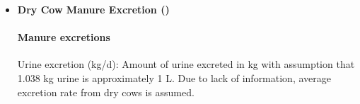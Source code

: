 \documentclass{article}
\begin{document}
\begin{refsection}
\begin{itemize}
Urine N excretion (kg/d)
        \vspace{0.5cm}
    
    \begin{center}
        \(
\text{urine}_{\text{nitrogen}} = \text{manure}_{\text{nitrogen}} - \text{fecal}_{\text{nitrogen}}
\)

    \end{center}
        \vspace{0.5cm} 
    
            {\raggedleft \textbf{[AN.EXC.16]}\par}
            \vspace{0.5cm}

Manure total ammoniacal nitrogen (kg/d) 
        \vspace{0.5cm}
    
    \begin{center}
        \(manure\_total\_ammoniacal\_nitrogen = urine\_nitrogen\)
    \end{center}
        \vspace{0.5cm} 
    
            {\raggedleft \textbf{[AN.EXC.9]}\par}
            \vspace{0.5cm} 

Manure K excretion (g/d)
        \vspace{0.5cm}
    
    \begin{center}
        \(Potassium = 7.21 * dry\_matter\_intake + 15944 * \frac{potassium\_concentration }{100} - 164.5
\)
    \end{center}
        \vspace{0.5cm} 
    
            {\raggedleft \textbf{[AN.EXC.27]}\par}
            \vspace{0.5cm} 

\item \textbf{Dry Cow Manure Excretion ()}

\paragraph{Manure excretions}
\vspace{-0.25cm}

Urine excretion (kg/d): Amount of urine excreted in kg with assumption that 1.038 kg urine is approximately 1 L. Due to lack of information, average excretion rate from dry cows is assumed.
        \vspace{0.5cm}
    

\end{itemize}
\end{refsection}
\end{document}
